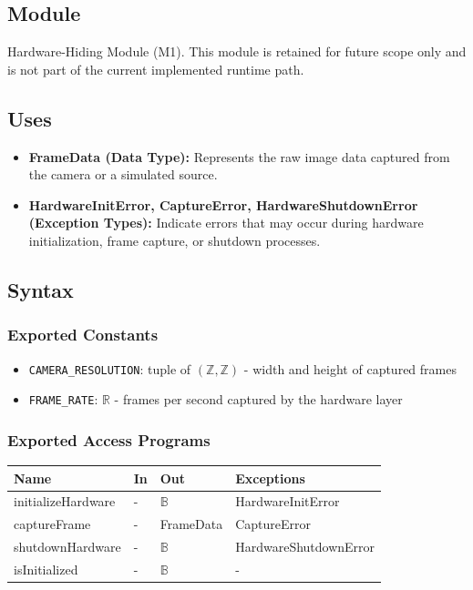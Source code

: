 \documentclass[12pt, titlepage]{article}
\begin{document}
\subsection{Module}
Hardware-Hiding Module (M1).
This module is retained for future scope only and is not part of the current implemented runtime path.

\subsection{Uses}
\begin{itemize}
    \item \textbf{FrameData (Data Type):} Represents the raw image data captured from the camera or a simulated source.
    \item \textbf{HardwareInitError, CaptureError, HardwareShutdownError (Exception Types):} Indicate errors that may occur during hardware initialization, frame capture, or shutdown processes.
\end{itemize}

\subsection{Syntax}

\subsubsection{Exported Constants}
\begin{itemize}
\item \texttt{CAMERA\_RESOLUTION}: tuple of $(\mathbb{Z}, \mathbb{Z})$ - width and height of captured frames
\item \texttt{FRAME\_RATE}: $\mathbb{R}$ - frames per second captured by the hardware layer
\end{itemize}

\subsubsection{Exported Access Programs}
\begin{center}
\begin{tabular}{p{5cm} p{3cm} p{3cm} p{5cm}}
\hline
\textbf{Name} & \textbf{In} & \textbf{Out} & \textbf{Exceptions} \\
\hline
initializeHardware & - & $\mathbb{B}$ & HardwareInitError \\
captureFrame & - & FrameData & CaptureError \\
shutdownHardware & - & $\mathbb{B}$ & HardwareShutdownError \\
isInitialized & - & $\mathbb{B}$ & - \\
\hline
\end{tabular}
\end{center}
\end{document}
